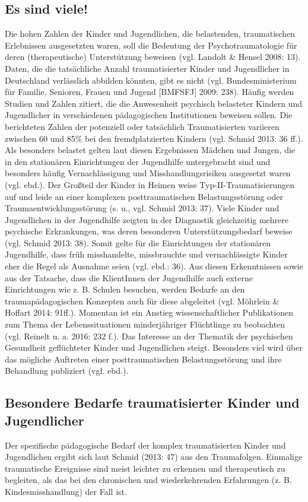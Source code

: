 \subsection{Es sind viele!}
Die hohen Zahlen der Kinder und Jugendlichen, die belastenden, traumatischen Erlebnissen ausgesetzten waren, soll die Bedeutung der Psychotraumatologie für deren (therapeutische) Unterstützung beweisen (vgl. Landolt \& Hensel 2008: 13). Daten, die die tatsächliche Anzahl traumatisierter Kinder und Jugendlicher in Deutschland verlässlich abbilden könnten, gibt es nicht (vgl. Bundesministerium für Familie, Senioren, Frauen und Jugend [BMFSFJ] 2009: 238). Häufig werden Studien und Zahlen zitiert, die die Anwesenheit psychisch belasteter Kindern und Jugendlicher in verschiedenen pädagogischen Institutionen beweisen sollen. Die berichteten Zahlen der potenziell oder tatsächlich Traumatisierten variieren zwischen 60 und 85\% bei den fremdplatzierten Kindern (vgl. Schmid 2013: 36 ff.). Als besonders belastet gelten laut diesen Ergebnissen Mädchen und Jungen, die in den stationären Einrichtungen der Jugendhilfe untergebracht sind und besonders häufig Vernachlässigung und Misshandlungsrisiken ausgesetzt waren (vgl. ebd.). Der Großteil der Kinder in Heimen weise Typ-II-Traumatisierungen auf und leide an einer komplexen posttraumatischen Belastungsstörung oder Traumaentwicklungsstörung (s. u., vgl. Schmid 2013: 37). Viele Kinder und Jugendlichen in der Jugendhilfe zeigten in der Diagnostik gleichzeitig mehrere psychische Erkrankungen, was deren besonderen Unterstützungsbedarf beweise (vgl. Schmid 2013: 38). Somit gelte für die Einrichtungen der station{\"a}ren Jugendhilfe, dass früh misshandelte, missbrauchte und vernachlässigte Kinder eher die Regel als Ausnahme seien (vgl. ebd.: 36). Aus diesen Erkenntnissen sowie aus der Tatsache, dass die KlientInnen der Jugendhilfe auch externe Einrichtungen wie z. B. Schulen besuchen, werden Bedarfe an den traumapädagogischen Konzepten auch für diese abgeleitet (vgl. Möhrlein \& Hoffart 2014: 91ff.). Momentan ist ein Anstieg wissenschaftlicher Publikationen zum Thema der Lebenssituationen minderj{\"a}hriger Fl{\"u}chtlinge zu beobachten (vgl. Reinelt u. a. 2016: 232 f.). Das Interesse an der Thematik der psychischen Gesundheit gefl{\"u}chteter Kinder und Jugendlichen steigt. Besonders viel wird über das m{\"o}gliche Auftreten einer posttraumatischen Belastungsst{\"o}rung und ihre Behandlung publiziert (vgl. ebd.).

\subsection{Besondere Bedarfe traumatisierter Kinder und Jugendlicher}
Der spezifische pädagogische Bedarf der komplex traumatisierten Kinder und Jugendlichen ergibt sich laut Schmid (2013: 47) aus den Traumafolgen. Einmalige traumatische Ereignisse sind meist leichter zu erkennen und therapeutisch zu begleiten, als das bei den chronischen und wiederkehrenden Erfahrungen (z. B. Kindesmisshandlung) der Fall ist.  

